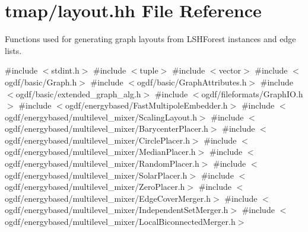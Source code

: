 \hypertarget{layout_8hh}{}\section{tmap/layout.hh File Reference}
\label{layout_8hh}


Functions used for generating graph layouts from L\+S\+H\+Forest instances and edge lists.  


{\ttfamily \#include $<$stdint.\+h$>$}\newline
{\ttfamily \#include $<$tuple$>$}\newline
{\ttfamily \#include $<$vector$>$}\newline
{\ttfamily \#include $<$ogdf/basic/\+Graph.\+h$>$}\newline
{\ttfamily \#include $<$ogdf/basic/\+Graph\+Attributes.\+h$>$}\newline
{\ttfamily \#include $<$ogdf/basic/extended\+\_\+graph\+\_\+alg.\+h$>$}\newline
{\ttfamily \#include $<$ogdf/fileformats/\+Graph\+I\+O.\+h$>$}\newline
{\ttfamily \#include $<$ogdf/energybased/\+Fast\+Multipole\+Embedder.\+h$>$}\newline
{\ttfamily \#include $<$ogdf/energybased/multilevel\+\_\+mixer/\+Scaling\+Layout.\+h$>$}\newline
{\ttfamily \#include $<$ogdf/energybased/multilevel\+\_\+mixer/\+Barycenter\+Placer.\+h$>$}\newline
{\ttfamily \#include $<$ogdf/energybased/multilevel\+\_\+mixer/\+Circle\+Placer.\+h$>$}\newline
{\ttfamily \#include $<$ogdf/energybased/multilevel\+\_\+mixer/\+Median\+Placer.\+h$>$}\newline
{\ttfamily \#include $<$ogdf/energybased/multilevel\+\_\+mixer/\+Random\+Placer.\+h$>$}\newline
{\ttfamily \#include $<$ogdf/energybased/multilevel\+\_\+mixer/\+Solar\+Placer.\+h$>$}\newline
{\ttfamily \#include $<$ogdf/energybased/multilevel\+\_\+mixer/\+Zero\+Placer.\+h$>$}\newline
{\ttfamily \#include $<$ogdf/energybased/multilevel\+\_\+mixer/\+Edge\+Cover\+Merger.\+h$>$}\newline
{\ttfamily \#include $<$ogdf/energybased/multilevel\+\_\+mixer/\+Independent\+Set\+Merger.\+h$>$}\newline
{\ttfamily \#include $<$ogdf/energybased/multilevel\+\_\+mixer/\+Local\+Biconnected\+Merger.\+h$>$}\newline
